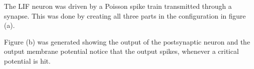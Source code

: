 \documentclass[fleqn,12pt]{wlscirep}
\begin{document}
The LIF neuron was driven by a Poisson spike train transmitted through a synapse. This was done by creating all three parts in the configuration in figure (a).

\begin{figure}[ht]
    \centering
    \qquad
    \label{fig:SingleNeuronFigures}
\end{figure}

Figure (b) was generated showing the output of the postsynaptic neuron and the output membrane potential notice that the output spikes, whenever a critical potential is hit.
\end{document}
